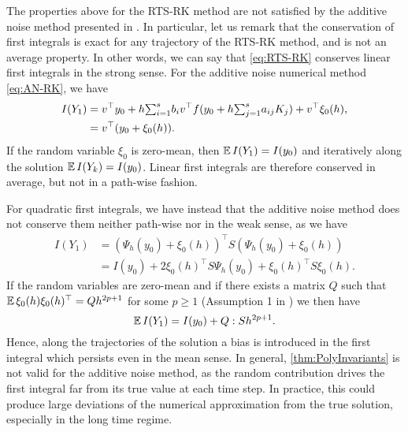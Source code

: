 \documentclass[10pt]{article}
\begin{document}
The properties above for the RTS-RK method are not satisfied by the additive noise method presented in \cite{CGS17}. In particular, let us remark that the conservation of first integrals is exact for any trajectory of the RTS-RK method, and is not an average property. In other words, we can say that \eqref{eq:RTS-RK} conserves linear first integrals in the strong sense. For the additive noise numerical method \eqref{eq:AN-RK}, we have
\begin{equation}
	\begin{aligned}
	I(Y_1) &= v^\top  y_0 + h {\textstyle\sum}_{i=1}^s b_iv^\top  f(y_0 + h{\textstyle\sum}_{j=1}^{s} a_{ij}K_j) + v^\top  \xi_0(h), \\
	&= v^\top  (y_0 + \xi_0(h)).
	\end{aligned}
\end{equation}
If the random variable $\xi_0$ is zero-mean, then $\operatorname{\mathbb{E}} I(Y_1) = I(y_0)$ and iteratively along the solution $\operatorname{\mathbb{E}} I(Y_k) = I(y_0)$. Linear first integrals are therefore conserved in average, but not in a path-wise fashion.

For quadratic first integrals, we have instead that the additive noise method does not conserve them neither path-wise nor in the weak sense, as we have
\begin{equation}
\begin{aligned}
	I(Y_1) &= (\Psi_h(y_0) + \xi_0(h))^\top  S (\Psi_h(y_0) + \xi_0(h)) \\
	&= I(y_0) + 2\xi_0(h)^\top  S  \Psi_h(y_0) + \xi_0(h)^\top  S \xi_0(h).
\end{aligned}
\end{equation}
If the random variables are zero-mean and if there exists a matrix $Q$ such that $\operatorname{\mathbb{E}}\xi_0(h)\xi_0(h)^\top  = Qh^{2p + 1}$ for some $p \geq 1$ (Assumption 1 in \cite{CGS17}) we then have
\begin{equation}\label{eq:BiasQuadraticAddNoise}
\operatorname{\mathbb{E}} I(Y_1) = I(y_0) + Q : S h^{2p + 1}.
\end{equation}
Hence, along the trajectories of the solution a bias is introduced in the first integral which persists even in the mean sense. In general, \cref{thm:PolyInvariants} is not valid for the additive noise method, as the random contribution drives the first integral far from its true value at each time step. In practice, this could produce large deviations of the numerical approximation from the true solution, especially in the long time regime.
\end{document}
